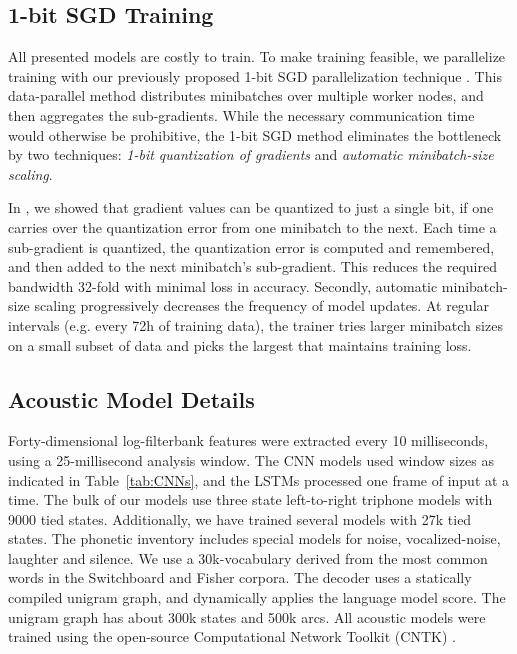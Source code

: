 \documentclass{article}
\begin{document}
\subsection{1-bit SGD Training}
All presented models are costly to train. To make training feasible, we parallelize training with our previously proposed 1-bit SGD parallelization technique \cite{seide20141}. This data-parallel method distributes minibatches over multiple worker nodes, and then aggregates the sub-gradients. 
While the necessary communication time would otherwise be prohibitive, 
the 1-bit SGD method eliminates the bottleneck by two techniques: {\em 1-bit quantization of gradients} and {\em automatic minibatch-size scaling}.

In \cite{seide20141}, we showed that gradient values can be quantized to just a single bit, if one carries over the quantization error from one minibatch to the next. Each time a sub-gradient is quantized, the quantization error is computed and remembered, and then added to the next minibatch's sub-gradient. This reduces the required bandwidth 32-fold with minimal loss in accuracy.
Secondly, automatic minibatch-size scaling progressively decreases the frequency of model updates. At regular intervals (e.g. every 72h of training data), the trainer tries larger minibatch sizes on a small subset of data and picks the largest that maintains training loss.

\vspace*{-0.1in}
\subsection{Acoustic Model Details}

Forty-dimensional log-filterbank features were extracted every 10 milliseconds,
using a 25-millisecond analysis window. The CNN models used window sizes
as indicated in Table~\ref{tab:CNNs}, and the LSTMs processed one frame
of input at a time. The bulk of our models
use three state left-to-right triphone models 
with 9000 tied states. Additionally, we have trained several models with
27k tied states. The phonetic 
inventory includes special models for 
noise, vocalized-noise, laughter and silence. We use a 30k-vocabulary
derived from the most common words in the Switchboard and Fisher corpora.
The decoder uses a statically compiled unigram graph, and dynamically
applies the language model score. The unigram graph has about 300k states and
500k arcs. All acoustic models were trained using the open-source
Computational Network Toolkit (CNTK) \cite{CNTK}.
\end{document}
